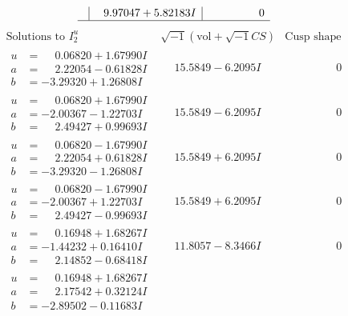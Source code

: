 \documentclass[1p]{elsarticle_modified}
\theoremstyle{definition}
\newcommand{\I}{\sqrt{-1}}
\begin{document}
$$\begin{array}{c|c|c}
 & \phantom{-}9.97047 + 5.82183 I & \phantom{-0.000000 } 0\\
 \hline 
 \end{array}$$\newpage$$\begin{array}{c|c|c}  
\text{Solutions to }I^u_{2}& \I (\text{vol} + \sqrt{-1}CS) & \text{Cusp shape}\\
 \hline 
\begin{aligned}
u &= \phantom{-}0.06820 + 1.67990 I \\
a &= \phantom{-}2.22054 - 0.61828 I \\
b &= -3.29320 + 1.26808 I\end{aligned}
 & \phantom{-}15.5849 - 6.2095 I & \phantom{-0.000000 } 0 \\ \hline\begin{aligned}
u &= \phantom{-}0.06820 + 1.67990 I \\
a &= -2.00367 - 1.22703 I \\
b &= \phantom{-}2.49427 + 0.99693 I\end{aligned}
 & \phantom{-}15.5849 - 6.2095 I & \phantom{-0.000000 } 0 \\ \hline\begin{aligned}
u &= \phantom{-}0.06820 - 1.67990 I \\
a &= \phantom{-}2.22054 + 0.61828 I \\
b &= -3.29320 - 1.26808 I\end{aligned}
 & \phantom{-}15.5849 + 6.2095 I & \phantom{-0.000000 } 0 \\ \hline\begin{aligned}
u &= \phantom{-}0.06820 - 1.67990 I \\
a &= -2.00367 + 1.22703 I \\
b &= \phantom{-}2.49427 - 0.99693 I\end{aligned}
 & \phantom{-}15.5849 + 6.2095 I & \phantom{-0.000000 } 0 \\ \hline\begin{aligned}
u &= \phantom{-}0.16948 + 1.68267 I \\
a &= -1.44232 + 0.16410 I \\
b &= \phantom{-}2.14852 - 0.68418 I\end{aligned}
 & \phantom{-}11.8057 - 8.3466 I & \phantom{-0.000000 } 0 \\ \hline\begin{aligned}
u &= \phantom{-}0.16948 + 1.68267 I \\
a &= \phantom{-}2.17542 + 0.32124 I \\
b &= -2.89502 - 0.11683 I\end{aligned}

\end{array}$$
\end{document}

